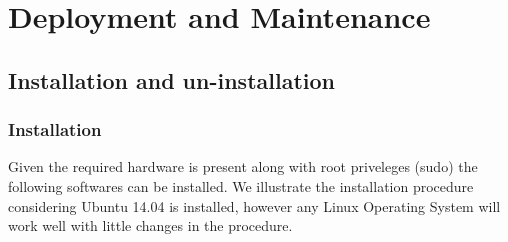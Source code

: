 \documentclass[12pt,a4paper,final]{report}
\begin{document}
\newpage
{}
\chapter{Deployment and Maintenance}
\thispagestyle{empty}
\newpage
\section{Installation and un-installation}
\subsection{Installation}
Given the required hardware is present along with root priveleges (sudo) the following softwares can be installed. We illustrate the installation procedure considering Ubuntu 14.04 is installed, however any Linux Operating System will work well with little changes in the procedure.
\end{document}
